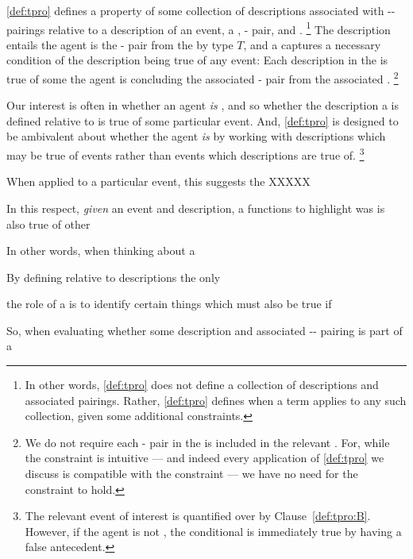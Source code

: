 \begin{note}
  \noindent%
  \autoref{def:tpro} defines a property of some collection of descriptions associated with -- pairings relative to a description of an event, a \torNa{}, - pair, and \pool{}.%
  \footnote{
    In other words, \autoref{def:tpro} does not define a collection of descriptions and associated pairings.
    Rather, \autoref{def:tpro} defines when a term applies to any such collection, given some additional constraints.
  }
  The description entails the agent is \tCV{} the - pair from the \pool{} by type \(T\), and a \tpro{} captures a necessary condition of the description being true of any event:
  Each description in the \tpro{} is true of some \eiw{} the agent is concluding the associated - pair from the associated \pool{}.%
  \footnote{
    We do not require each - pair in the \tpro{} is included in the relevant \torNa{}.
    For, while the constraint is intuitive --- and indeed every application of \autoref{def:tpro} we discuss is compatible with the constraint --- we have no need for the constraint to hold.
  }
\end{note}

\begin{note}
  Our interest is often in whether an agent \emph{is} \tCV{}, and so whether the description a \tpro{} is defined relative to is true of some particular event.
  And, \autoref{def:tpro} is designed to be ambivalent about whether the agent \emph{is} \tCV{} by working with descriptions which may be true of events rather than events which descriptions are true of.%
  \footnote{
    The relevant event of interest is quantified over by Clause~\ref{def:tpro:B}.
    However, if the agent is not \tCV{}, the conditional is immediately true by having a false antecedent.
  }

  When applied to a particular event, this suggests the XXXXX

  In this respect, \emph{given} an event and description, a \tpro{} functions to highlight was is also true of other 

  In other words, when thinking about a \tpro{} 

  

  By defining  relative to descriptions the only 


  the role of a \tpro{} is to identify certain things which must also be true if 

  So, when evaluating whether some description and associated -- pairing is part of a \tpro{} 
\end{note}

